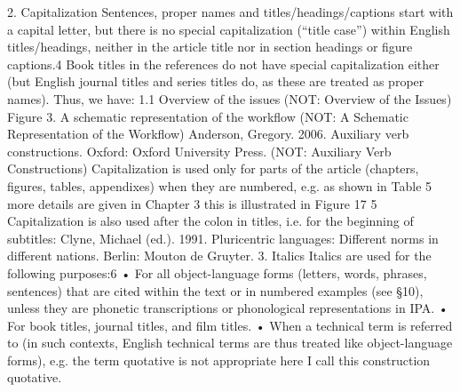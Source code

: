 2. Capitalization
Sentences, proper names and titles/headings/captions start with a capital letter, but there is
no special capitalization (“title case”) within English titles/headings, neither in the article
title nor in section headings or figure captions.4 Book titles in the references do not have
special capitalization either (but English journal titles and series titles do, as these are
treated as proper names). Thus, we have:
1.1 Overview of the issues
(NOT: Overview of the Issues)
Figure 3. A schematic representation of the workflow
(NOT: A Schematic Representation of the Workflow)
Anderson, Gregory. 2006. Auxiliary verb constructions. Oxford: Oxford University Press.
(NOT: Auxiliary Verb Constructions)
Capitalization is used only for parts of the article (chapters, figures, tables, appendixes)
when they are numbered, e.g.
as shown in Table 5
more details are given in Chapter 3
this is illustrated in Figure 17
5
Capitalization is also used after the colon in titles, i.e. for the beginning of subtitles:
Clyne, Michael (ed.). 1991. Pluricentric languages: Different norms in different nations. Berlin: Mouton
de Gruyter.
3. Italics
Italics are used for the following purposes:6
• For all object-language forms (letters, words, phrases, sentences) that are cited within
the text or in numbered examples (see §10), unless they are phonetic transcriptions
or phonological representations in IPA.
• For book titles, journal titles, and film titles.
• When a technical term is referred to (in such contexts, English technical terms are
thus treated like object-language forms), e.g.
the term quotative is not appropriate here
I call this construction quotative.
	
 	
 	
 	
 	
 	
 	
 	
 	
 	
 	
 	
 	
 	
 	
 	
 	
 	
 	
 	
 	
 	
 	
 	
 	
 	
 	
 	
 	
 	
 	
 	
 	
 	
 	
 	
 	
 	
 	
 	
 	
